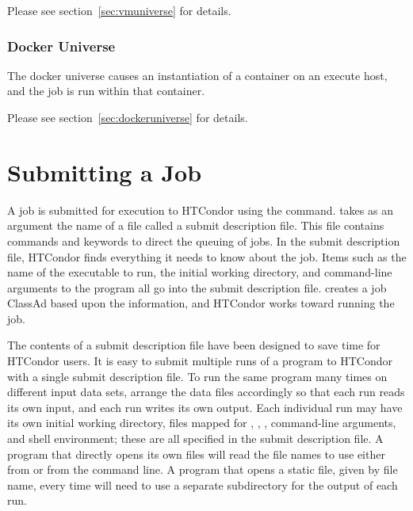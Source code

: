 Please see section~\ref{sec:vmuniverse} for details.

\subsubsection{Docker Universe}
The docker universe causes an instantiation of a container
on an execute host,
and the job is run within that container.  

Please see section~\ref{sec:dockeruniverse} for details.

\section{\label{sec:submitting}Submitting a Job}

A job is submitted for execution to HTCondor using the
 command.
 takes as an argument the name of a
file called a submit description file.
This file contains commands and keywords to direct the queuing of jobs.
In the submit description file, HTCondor finds everything it needs
to know about the job.  Items such as the name of the executable to run,
the initial working directory, and command-line arguments to the
program all go into
the submit description file.   creates a job
ClassAd based upon the information,
and HTCondor
works toward running the job.

The contents of a submit description file have been designed to
save time for HTCondor users.
It is easy to submit multiple runs of a program to HTCondor
with a single submit description file.
To run the same program many times on
different input data sets, arrange the data files
accordingly so that each run reads its own input, and each run
writes its own output.
Each individual run may have its own initial
working directory, files mapped for , ,
, command-line arguments, and
shell environment;  these are all specified in the submit description file.
A program that directly opens its own
files will read the file names to use either from 
or from the command line. 
A program that opens a static file, given by file name, every time
will need to use a separate subdirectory for the output of each run.

